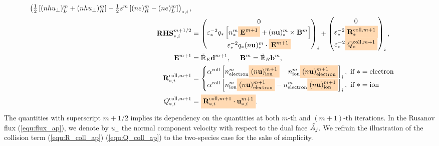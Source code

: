 \documentclass{article}
\newcommand{\mycolorbox}[2]{\colorbox{#1}{$\displaystyle#2$}}
\begin{document}
\begin{subequations}
\begin{align}
\begin{pmatrix}
    \frac{1}{2}\left[(nhu_\bot)^m_{L} + (nhu_\bot)^m_{R}\right] - \frac{1}{2}s^m\left[(ne)^m_{R} - (ne)^m_{L}\right]
    \end{pmatrix}_{\ast,i}, \label{equ:flux_ap}\\
    \mathbf{RHS}_{*,i}^{m+1/2} &=
    \begin{pmatrix}
    0 \\
    \varepsilon_*^{-2}q_*\left[n_*^m\mycolorbox{orange!30}{\mathbf{E}^{m+1}} + (n\mathbf{u})^m_*\times\mathbf{B}^m\right] \\
    \varepsilon_*^{-2}q_*(n\mathbf{u})^m_* \cdot \mycolorbox{orange!30}{\mathbf{E}^{m+1}}
    \end{pmatrix}_i +
    \begin{pmatrix}
    0 \\
    \varepsilon_*^{-2}\mycolorbox{orange!30}{\mathbf{R}_{*}^{\text{coll},m+1}} \\
    \varepsilon_*^{-2}\mycolorbox{orange!30}{Q_*^{\text{coll}, m+1}} 
    \end{pmatrix}_i, \label{equ:rhs_ap}\\
    \mathbf{E}^{m+1} &= \Tilde{\mathbb{R}}_E\mathbf{d}^{m+1},
    \ \ \ \ 
    \mathbf{B}^{m} = \Tilde{\mathbb{R}}_B\mathbf{b}^{m}, \\
    \mathbf{R}_{*,i}^{\text{coll},m+1} &= 
    \begin{cases}
    \alpha^\text{coll}\left[n_{\text{electron}}^m\mycolorbox{orange!30}{(n\mathbf{u})^{m+1}_{\text{ion}}} - n_{\text{ion}}^m\mycolorbox{orange!30}{(n\mathbf{u})^{m+1}_{\text{electron}}}\right]_i, \text{   if   } * = \text{electron} \\
    \alpha^\text{coll}\left[n_{\text{ion}}^m\mycolorbox{orange!30}{(n\mathbf{u})^{m+1}_{\text{electron}}} - n_{\text{electron}}^m\mycolorbox{orange!30}{(n\mathbf{u})^{m+1}_{\text{ion}}}\right]_i, \text{   if   } * = \text{ion}
    \end{cases}  \label{equ:R_coll_ap}\\
    Q_{*,i}^{\text{coll},m+1} &= \mycolorbox{orange!30}{\mathbf{R}_{*,i}^{\text{coll},m+1} \cdot \mathbf{u}_{\ast,i}^{m+1}} \label{equ:Q_coll_ap}
.\end{align}
\end{subequations}
The quantities with superscript $m+1/2$ implies its dependency on the quantities at both $m$-th and $(m+1)$-th iterations. In the Rusanov flux (\ref{equ:flux_ap}), we denote by $u_\perp$ the normal component velocity with respect to the dual face $\Tilde{A}_j$. We refrain the illustration of the collision term (\ref{equ:R_coll_ap}) (\ref{equ:Q_coll_ap}) to the two-species case for the sake of simplicity. 
\end{document}
